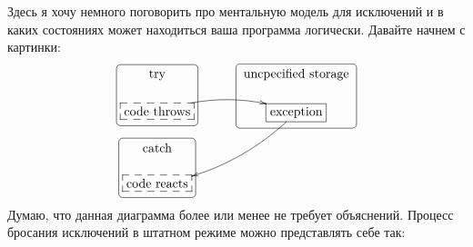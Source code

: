 Здесь я хочу немного поговорить про ментальную модель для исключений и в каких состояниях может находиться ваша программа логически.
Давайте начнем с картинки:
\[
\xymatrix@R=15pt@C=15pt{
  {\text{try}}
 	{
	\save
   [].[d]*+[F-:<3pt>]\frm{}
   \restore
	}
  &{}&{\text{uncpecified storage}}
   	{
	\save
   [].[d]*+[F-:<3pt>]\frm{}
   \restore
	}
  \\
  {\text{code throws}}\ar@/^10pt/[rr]
       	{
	\save
   [].[]*[F--]\frm{}
   \restore
	}
  &{}&{\text{exception}}\ar@/^10pt/[ddll]
   	{
	\save
   [].[]*[F-]\frm{}
   \restore
	}
  \\
  {\text{catch}}
   	{
	\save
   [].[d]*+[F-:<3pt>]\frm{}
   \restore
	}
  &{}&{}\\
  {\text{code reacts}}
     	{
	\save
   [].[]*[F--]\frm{}
   \restore
	}
  &{}&{}\\
}
\]
Думаю, что данная диаграмма более или менее не требует объяснений.
Процесс бросания исключений в штатном режиме можно представлять себе так:
